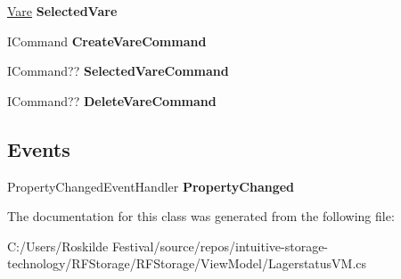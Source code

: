 \begin{DoxyCompactItemize}
\item 
\mbox{\label{class_r_f_storage_1_1_view_model_1_1_lagerstatus_v_m_aec973014fee1ea52f14983c7df9c9cf1}} 
\mbox{\hyperlink{class_r_f_storage_1_1_model_1_1_vare}{Vare}} {\bfseries Selected\+Vare}
\item 
\mbox{\label{class_r_f_storage_1_1_view_model_1_1_lagerstatus_v_m_af1e3d51fd5e6a066d834e8eb618187e5}} 
I\+Command {\bfseries Create\+Vare\+Command}
\item 
\mbox{\label{class_r_f_storage_1_1_view_model_1_1_lagerstatus_v_m_a651ee3292d11689b79ad818cb127ff6e}} 
I\+Command?? {\bfseries Selected\+Vare\+Command}
\item 
\mbox{\label{class_r_f_storage_1_1_view_model_1_1_lagerstatus_v_m_a188312dcc43a82410bd1cd931b7f18be}} 
I\+Command?? {\bfseries Delete\+Vare\+Command}
\end{DoxyCompactItemize}
\subsection*{Events}
\begin{DoxyCompactItemize}
\item 
\mbox{\label{class_r_f_storage_1_1_view_model_1_1_lagerstatus_v_m_a7871a80d7ccacb6c91c8ad9af5152b8c}} 
Property\+Changed\+Event\+Handler {\bfseries Property\+Changed}
\end{DoxyCompactItemize}


The documentation for this class was generated from the following file\+:\begin{DoxyCompactItemize}
\item 
C\+:/\+Users/\+Roskilde Festival/source/repos/intuitive-\/storage-\/technology/\+R\+F\+Storage/\+R\+F\+Storage/\+View\+Model/Lagerstatus\+V\+M.\+cs\end{DoxyCompactItemize}
